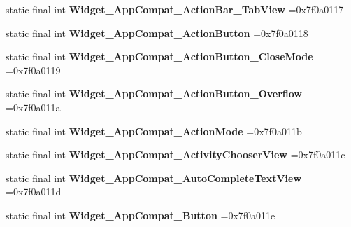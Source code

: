 \begin{DoxyCompactItemize}
\mbox{\label{classproject4_1_1xaria_1_1R_1_1style_a6b3514a20f87d0d4bc5d175aff3a1bc9}} 
static final int {\bfseries Widget\+\_\+\+App\+Compat\+\_\+\+Action\+Bar\+\_\+\+Tab\+View} =0x7f0a0117
\item 
\mbox{\label{classproject4_1_1xaria_1_1R_1_1style_a22163a23b862b802e5da96d958071a64}} 
static final int {\bfseries Widget\+\_\+\+App\+Compat\+\_\+\+Action\+Button} =0x7f0a0118
\item 
\mbox{\label{classproject4_1_1xaria_1_1R_1_1style_aa6460348d02b7361611f2fde713953c6}} 
static final int {\bfseries Widget\+\_\+\+App\+Compat\+\_\+\+Action\+Button\+\_\+\+Close\+Mode} =0x7f0a0119
\item 
\mbox{\label{classproject4_1_1xaria_1_1R_1_1style_aa43602e2640a625eba534e6179a524fa}} 
static final int {\bfseries Widget\+\_\+\+App\+Compat\+\_\+\+Action\+Button\+\_\+\+Overflow} =0x7f0a011a
\item 
\mbox{\label{classproject4_1_1xaria_1_1R_1_1style_a759bbfa26bfde1d29ed574682b6e1fdc}} 
static final int {\bfseries Widget\+\_\+\+App\+Compat\+\_\+\+Action\+Mode} =0x7f0a011b
\item 
\mbox{\label{classproject4_1_1xaria_1_1R_1_1style_a2a362a48ecdb980584e7e65778165266}} 
static final int {\bfseries Widget\+\_\+\+App\+Compat\+\_\+\+Activity\+Chooser\+View} =0x7f0a011c
\item 
\mbox{\label{classproject4_1_1xaria_1_1R_1_1style_a534e6863d50ae3ab0bbc941da4abdc21}} 
static final int {\bfseries Widget\+\_\+\+App\+Compat\+\_\+\+Auto\+Complete\+Text\+View} =0x7f0a011d
\item 
\mbox{\label{classproject4_1_1xaria_1_1R_1_1style_a22934699fd6ac52ba60b4a634e537643}} 
static final int {\bfseries Widget\+\_\+\+App\+Compat\+\_\+\+Button} =0x7f0a011e
\item 
\mbox{\label{classproject4_1_1xaria_1_1R_1_1style_af17be66f9ab8cea8bad4577d06533754}} 

\end{DoxyCompactItemize}
